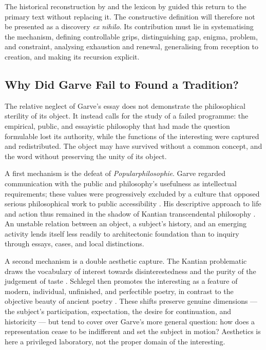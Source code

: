 \documentclass[11pt,a4paper]{article}
\begin{document}
The historical reconstruction by \textcite{nannini2018garve} and the lexicon by
\textcite{nannini2018interesting} guided this return to the primary text without
replacing it. The constructive definition will therefore not be presented as a
discovery \emph{ex nihilo}. Its contribution must lie in systematising the
mechanism, defining controllable grips, distinguishing gap, enigma, problem, and
constraint, analysing exhaustion and renewal, generalising from reception to
creation, and making its recursion explicit.

\subsection{Why Did Garve Fail to Found a Tradition?}

The relative neglect of Garve's essay does not demonstrate the philosophical
sterility of its object. It instead calls for the study of a failed programme:
the empirical, public, and essayistic philosophy that had made the question
formulable lost its authority, while the functions of the interesting were
captured and redistributed. The object may have survived without a common
concept, and the word without preserving the unity of its object.

A first mechanism is the defeat of \emph{Popularphilosophie}. Garve regarded
communication with the public and philosophy's usefulness as intellectual
requirements; these values were progressively excluded by a culture that
opposed serious philosophical work to public accessibility
\parencite{thompson2018garve}. His descriptive approach to life and action thus
remained in the shadow of Kantian transcendental philosophy
\parencite{bachmannmedick2008anziehungskraft}. An unstable relation between an
object, a subject's history, and an emerging activity lends itself less readily
to architectonic foundation than to inquiry through essays, cases, and local
distinctions.

A second mechanism is a double aesthetic capture. The Kantian problematic draws
the vocabulary of interest towards disinterestedness and the purity of the
judgement of taste \parencite{kant1993juger}. Schlegel then promotes the
interesting as a feature of modern, individual, unfinished, and perfectible
poetry, in contrast to the objective beauty of ancient poetry
\parencite{schlegel2001study,nannini2018interesting}. These shifts preserve
genuine dimensions --- the subject's participation, expectation, the desire for
continuation, and historicity --- but tend to cover over Garve's more general
question: how does a representation cease to be indifferent and set the subject
in motion? Aesthetics is here a privileged laboratory, not the proper domain of
the interesting.
\end{document}
